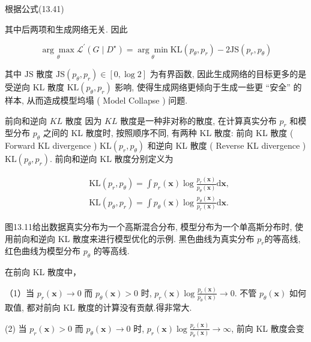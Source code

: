 \documentclass[10pt]{article}
\begin{document}
根据公式(13.41)

其中后两项和生成网络无关. 因此


\begin{equation*}
\underset{\theta}{\arg \max } \mathcal{L}^{\prime}\left(G \mid D^{\star}\right)=\underset{\theta}{\arg \min } \mathrm{KL}\left(p_{\theta}, p_{r}\right)-2 \mathrm{JS}\left(p_{r}, p_{\theta}\right) \tag{13.47}
\end{equation*}


其中 $\mathrm{JS}$ 散度 $\mathrm{JS}\left(p_{\theta}, p_{r}\right) \in[0, \log 2]$ 为有界函数, 因此生成网络的目标更多的是受逆向 KL 散度 $\mathrm{KL}\left(p_{\theta}, p_{r}\right)$ 影响, 使得生成网络更倾向于生成一些更 “安全” 的样本, 从而造成模型坞塌 ( Model Collapse ) 问题.

前向和逆向 $K L$ 散度 因为 $K L$ 散度是一种非对称的散度, 在计算真实分布 $p_{r}$ 和模型分布 $p_{\theta}$ 之间的 KL 散度时, 按照顺序不同, 有两种 KL 散度: 前向 KL 散度 ( Forward KL divergence ) $\mathrm{KL}\left(p_{r}, p_{\theta}\right)$ 和逆向 KL 散度 ( Reverse KL divergence ) $\mathrm{KL}\left(p_{\theta}, p_{r}\right)$. 前向和逆向 $\mathrm{KL}$ 散度分别定义为


\begin{align*}
& \mathrm{KL}\left(p_{r}, p_{\theta}\right)=\int p_{r}(\boldsymbol{x}) \log \frac{p_{r}(\boldsymbol{x})}{p_{\theta}(\boldsymbol{x})} \mathrm{d} \boldsymbol{x},  \tag{13.48}\\
& \mathrm{KL}\left(p_{\theta}, p_{r}\right)=\int p_{\theta}(\boldsymbol{x}) \log \frac{p_{\theta}(\boldsymbol{x})}{p_{r}(\boldsymbol{x})} \mathrm{d} \boldsymbol{x} . \tag{13.49}
\end{align*}


图13.11给出数据真实分布为一个高斯混合分布, 模型分布为一个单高斯分布时, 使用前向和逆向 KL 散度来进行模型优化的示例. 黑色曲线为真实分布 $p_{r}$的等高线,红色曲线为模型分布 $p_{\theta}$ 的等高线.

在前向 KL 散度中，

（1）当 $p_{r}(\boldsymbol{x}) \rightarrow 0$ 而 $p_{\theta}(\boldsymbol{x})>0$ 时, $p_{r}(\boldsymbol{x}) \log \frac{p_{r}(\boldsymbol{x})}{p_{\theta}(\boldsymbol{x})} \rightarrow 0$. 不管 $p_{\theta}(\boldsymbol{x})$ 如何取值, 都对前向 KL 散度的计算没有贡献.得非常大.

(2) 当 $p_{r}(\boldsymbol{x})>0$ 而 $p_{\theta}(\boldsymbol{x}) \rightarrow 0$ 时, $p_{r}(\boldsymbol{x}) \log \frac{p_{r}(\boldsymbol{x})}{p_{\theta}(\boldsymbol{x})} \rightarrow \infty$, 前向 KL 散度会变
\end{document}
